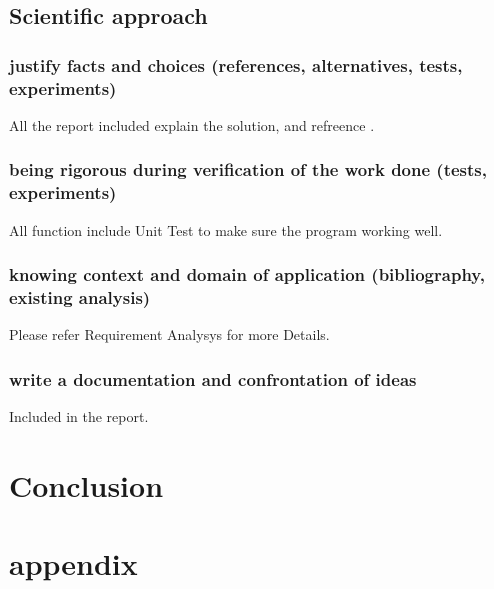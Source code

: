 \documentclass{article}
\begin{document}
\subsection{Scientific approach } 
\subsubsection{justify facts and choices (references, alternatives, tests, experiments)}
All the report included explain the solution, and refreence .
\subsubsection{being rigorous during verification of the work done (tests, experiments)}
All function include Unit Test to make sure the program working well.
\subsubsection{knowing context and domain of application (bibliography, existing analysis)}
Please refer Requirement Analysys for more Details.
\subsubsection{write a documentation and confrontation of ideas}
Included in the report.

\section{Conclusion }

\section{appendix }
\end{document}

